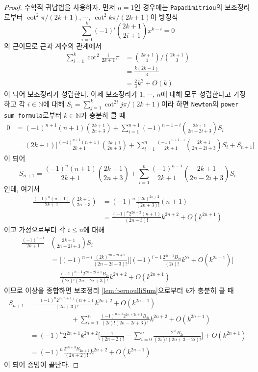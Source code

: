 \begin{proof}
    수학적 귀납법을 사용하자. 먼저 $n=1$인 경우에는 \texttt{Papadimitriou}의 보조정리로부터 $\cot^2\pi/(2k+1),\,\cdots,\,\cot^2k\pi/(2k+1)$이 방정식
    \begin{equation*}
        \sum_{i=0}^k(-1)^i\binom{2k+1}{2i+1}x^{k-i}=0
    \end{equation*}
    의 근이므로 근과 계수의 관계에서
    \begin{align*}
        \sum_{i=1}^k\cot^2\frac{i}{2k+1}\pi&=\binom{2k+1}{1}\bigg/\binom{2k+1}{3}\\
        &=\frac{k(2k-1)}{3}\\
        &=\frac{2}{3}k^2+O(k)
    \end{align*}
    이 되어 보조정리가 성립한다. 이제 보조정리가 $1,\,\cdots,\,n$에 대해 모두 성립한다고 가정하고 각 $i\in\mathbb{N}$에 대해 $S_i=\sum_{j=1}^k\cot^{2i}j\pi/(2k+1)$이라 하면 \texttt{Newton}의 \texttt{power sum formula}로부터 $k\in\mathbb{N}$가 충분히 클 때
    \begin{align*}
        0&=(-1)^{n+1}(n+1)\binom{2k+1}{2n+3}+\sum_{i=1}^{n+1}(-1)^{n+1-i}\binom{2k+1}{2n-2i+3}S_i\\
        &=(2k+1)\bigg[\frac{(-1)^{n+1}(n+1)}{2k+1}\binom{2k+1}{2n+3}+\sum_{i=1}^n\frac{(-1)^{n+1-i}}{2k+1}\binom{2k+1}{2n-2i+3}S_i+S_{n+1}\bigg]
    \end{align*}
    이 되어
    \begin{equation*}
        S_{n+1}=\frac{(-1)^n(n+1)}{2k+1}\binom{2k+1}{2n+3}+\sum_{i=1}^n\frac{(-1)^{n-i}}{2k+1}\binom{2k+1}{2n-2i+3}S_i
    \end{equation*}
    인데, 여기서
    \begin{align*}
        \frac{(-1)^n(n+1)}{2k+1}\binom{2k+1}{2n+3}&=(-1)^n\frac{(2k)^{\underline{2n+2}}}{(2n+3)!}(n+1)\\
        &=\frac{(-1)^n2^{2n+2}(n+1)}{(2n+3)!}k^{2n+2}+O(k^{2n+1})
    \end{align*}
    이고 가정으로부터 각 $i\leq n$에 대해
    \begin{align*}
        \frac{(-1)^{n-i}}{2k+1}&\binom{2k+1}{2n-2i+3}S_i\\
        &=\bigg[(-1)^{n-i}\frac{(2k)^{\underline{2n-2i+2}}}{(2n-2i+3)!}\bigg]\bigg[(-1)^{i-1}\frac{2^{4i-1}B_{2i}}{(2i)!}k^{2i}+O(k^{2i-1})\bigg]\\
        &=\frac{(-1)^{n-1}2^{2n+2i+1}B_{2i}}{(2i)!(2n-2i+3)!}k^{2n+2}+O(k^{2n+1})
    \end{align*}
    이므로 이상을 종합하면 보조정리 \ref{lem:bernoulliSum}으로부터 $k$가 충분히 클 때
    \begin{align*}
        S_{n+1}&=\frac{(-1)^n2^{2(n+1)}(n+1)}{(2n+3)!}k^{2n+2}+O(k^{2n+1})\\
        &\qquad\qquad\qquad+\sum_{i=1}^n\frac{(-1)^{n-1}2^{2n+2i+1}B_{2i}}{(2i)!(2n-2i+3)!}k^{2n+2}+O(k^{2n+1})\\
        &=(-1)^n2^{2n+1}k^{2n+2}\bigg[\frac{1}{(2n+2)!}-\sum_{i=0}^n\frac{2^{2i}B_{2i}}{(2i)!(2n+3-2i)!}\bigg]+O(k^{2n+1})\\
        &=(-1)^n\frac{2^{4n+3}B_{2n+2}}{(2n+2)!}k^{2n+2}+O(k^{2n+1})
    \end{align*}
    이 되어 증명이 끝난다.
\end{proof}

